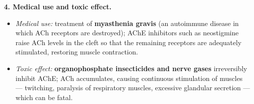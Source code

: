 \documentclass[11pt]{article}
\begin{document}
\begin{corrige}
\textbf{4. Medical use and toxic effect.}
\begin{itemize}
\item \emph{Medical use:} treatment of \textbf{myasthenia gravis} (an autoimmune disease in which ACh receptors are destroyed); AChE inhibitors such as neostigmine raise ACh levels in the cleft so that the remaining receptors are adequately stimulated, restoring muscle contraction.
\item \emph{Toxic effect:} \textbf{organophosphate insecticides and nerve gases} irreversibly inhibit AChE; ACh accumulates, causing continuous stimulation of muscles — twitching, paralysis of respiratory muscles, excessive glandular secretion — which can be fatal.
\end{itemize}
\end{corrige}
\end{document}
